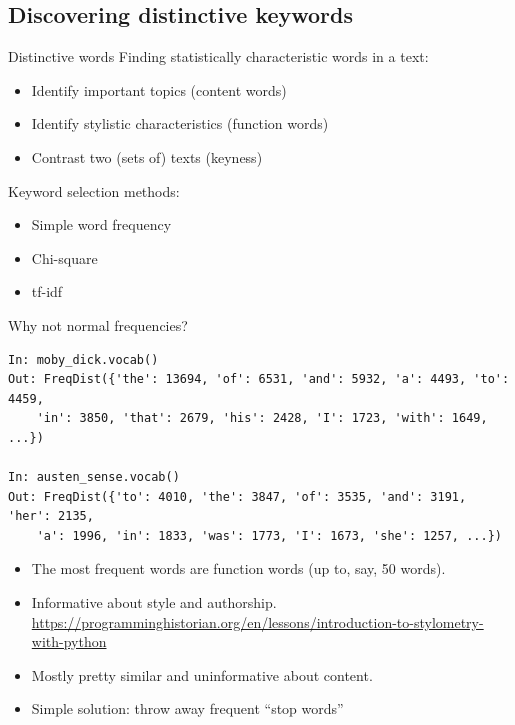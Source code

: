 \documentclass[aspectratio=169,usenames,dvipsnames]{beamer}
\begin{document}
\subsection{Discovering distinctive keywords}
\begin{frame}{Distinctive words}
    Finding statistically characteristic words in a text:
    \begin{itemize}
        \item Identify important topics (content words)
        \item Identify stylistic characteristics (function words)
        \item Contrast two (sets of) texts (keyness)
    \end{itemize}

    Keyword selection methods:
    \begin{itemize}
        \item Simple word frequency
        \item Chi-square
        \item tf-idf
    \end{itemize}

\end{frame}

\begin{frame}[fragile]{Why not normal frequencies?}
\begin{lstlisting}
In: moby_dick.vocab()
Out: FreqDist({'the': 13694, 'of': 6531, 'and': 5932, 'a': 4493, 'to': 4459,
    'in': 3850, 'that': 2679, 'his': 2428, 'I': 1723, 'with': 1649, ...})

In: austen_sense.vocab()
Out: FreqDist({'to': 4010, 'the': 3847, 'of': 3535, 'and': 3191, 'her': 2135,
    'a': 1996, 'in': 1833, 'was': 1773, 'I': 1673, 'she': 1257, ...})
\end{lstlisting}

\begin{itemize}
    \item The most frequent words are function words (up to, say, 50 words).
    \item Informative about style and authorship.
        \url{https://programminghistorian.org/en/lessons/introduction-to-stylometry-with-python}
    \item Mostly pretty similar and uninformative about content.
    \item Simple solution: throw away frequent ``stop words''
\end{itemize}
\end{frame}
\end{document}
